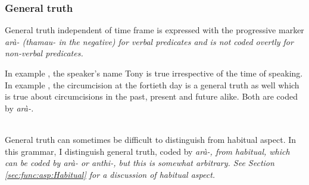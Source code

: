 \subsubsection{General truth}\label{sec:func:Generaltruth}
General truth independent of time frame is expressed with the progressive marker \em arà- \em (\em thamau- \em in the negative) for verbal predicates and is not coded overtly for non-verbal predicates.

%
In example , the speaker's name Tony is true irrespective of the time of speaking. In example , the circumcision at the fortieth day is a general truth as well which is true about circumcisions in the past, present and future alike. Both are coded by \em arà-\em.


\\

General truth can sometimes be difficult to distinguish from habitual aspect. In this grammar, I distinguish general truth, coded by \em arà-\em, from habitual, which can be coded by \em arà- \em or \em anthi-\em, but this is somewhat arbitrary. See Section \ref{sec:func:asp:Habitual} for a discussion of habitual aspect.

